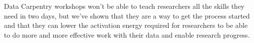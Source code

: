 \documentclass[15]{idcc}
\begin{document}
Data Carpentry workshops won't be able to teach researchers all the skills they need in two days, but we've shown that they are a way to get the process started and that they can lower the activation energy required for researchers to be able to do more and more effective work with their data and enable research progress.
\end{document}
